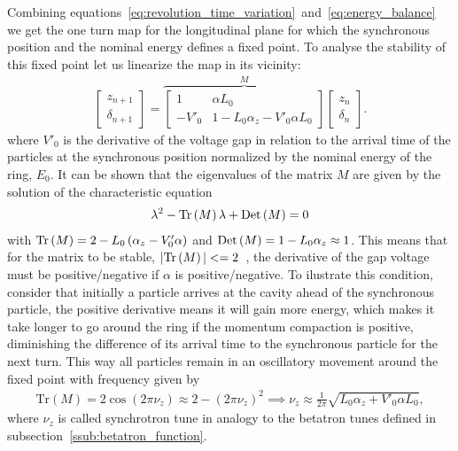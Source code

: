 	Combining equations~\eqref{eq:revolution_time_variation}~and~\eqref{eq:energy_balance} we get the one turn map for the longitudinal plane for which the synchronous position and the nominal energy defines a fixed point. To analyse the stability of this fixed point let us linearize the map in its vicinity:
	\begin{align}\label{eq:longitudinal_linear_map}
		\begin{bmatrix} z_{n+1} \\ \delta_{n+1}\end{bmatrix} = \overbrace{
			\begin{bmatrix}
                1 & \alpha L_0 \\
                -V'_0 & 1-L_0\alpha_z - V'_0\alpha L_0
            \end{bmatrix}
		}^M \begin{bmatrix} z_n \\ \delta_n \end{bmatrix}.
	\end{align}
	where $V'_0$ is the derivative of the voltage gap in relation to the arrival time of the particles at the synchronous position normalized by the nominal energy of the ring, $E_0$. It can be shown that the eigenvalues of the matrix $M$ are given by the solution of the characteristic equation
    \begin{align}
        \lambda^2 - \text{Tr}\left(M\right)\lambda + \text{Det}\left(M\right) = 0
    \end{align}
    with $\text{Tr}\left(M\right) = 2-L_0\left(\alpha_z-V'_0\alpha\right)$ and $\text{Det}\left(M\right) = 1-L_0\alpha_z\approx 1$. This means that for the matrix to be stable, $|\text{Tr}\left(M\right)| <= 2$~\cite{Courant1958}, the derivative of the gap voltage must be positive/negative if $\alpha$ is positive/negative. To ilustrate this condition, consider that initially a particle arrives at the cavity ahead of the synchronous particle, the positive derivative means it will gain more energy, which makes it take longer to go around the ring if the momentum compaction is positive, diminishing the difference of its arrival time to the synchronous particle for the next turn. This way all particles remain in an oscillatory movement around the fixed point with frequency given by
	\begin{align}\label{eq:synchrotron_tune}
		\text{Tr}(M) = 2\cos(2\pi\nu_z) \approx 2-(2\pi\nu_z)^2 \implies
		\nu_z \approx \frac{1}{2\pi}\sqrt{L_0\alpha_z+V'_0\alpha L_0},
	\end{align}
	where $\nu_z$ is called synchrotron tune in analogy to the betatron tunes defined in subsection~\ref{ssub:betatron_function}.

